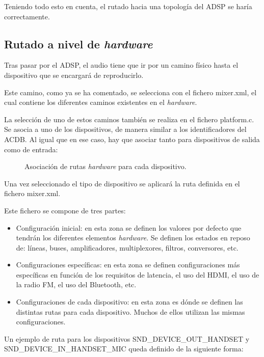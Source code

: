 Teniendo todo esto en cuenta, el rutado hacia una topología del \gls{ADSP} se haría correctamente.

\subsection{Rutado a nivel de \textit{hardware}}
Tras pasar por el \gls{ADSP}, el audio tiene que ir por un camino físico hasta el dispositivo que se encargará de reproducirlo.

Este camino, como ya se ha comentado, se selecciona con el fichero mixer.xml, el cual contiene los diferentes caminos existentes en el \textit{hardware}.

La selección de uno de estos caminos también se realiza en el fichero platform.c. Se asocia a uno de los dispositivos, de manera similar a los identificadores del \gls{ACDB}. Al igual que en ese caso, hay que asociar tanto para dispositivos de salida como de entrada:

\begin{figure}[H]
	\centering
	\caption{Asociación de rutas \textit{hardware} para cada dispositivo.} \label{fig:asociacion_snd_mixer}
\end{figure}

Una vez seleccionado el tipo de dispositivo se aplicará la ruta definida en el fichero mixer.xml.

Este fichero se compone de tres partes:
\begin{itemize}
	\item{Configuración inicial: en esta zona se definen los valores por defecto que tendrán los diferentes elementos \textit{hardware}. Se definen los estados en reposo de: líneas, buses, amplificadores, multiplexores, filtros, conversores, etc.}
	\item{Configuraciones específicas: en esta zona se definen configuraciones más específicas en función de los requisitos de latencia, el uso del \gls{HDMI}, el uso de la radio \gls{FM}, el uso del Bluetooth, etc.}
	\item{Configuraciones de cada dispositivo: en esta zona es dónde se definen las distintas rutas para cada dispositivo. Muchos de ellos utilizan las mismas configuraciones.}
\end{itemize}

Un ejemplo de ruta para los dispositivos SND\_DEVICE\_OUT\_HANDSET y \\ SND\_DEVICE\_IN\_HANDSET\_MIC queda definido de la siguiente forma:

